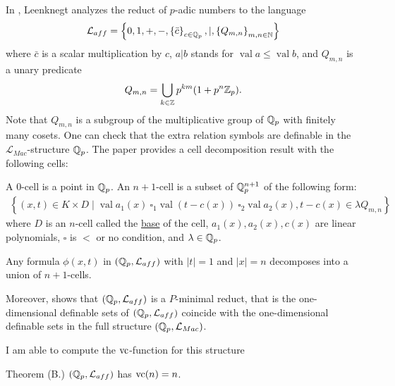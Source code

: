 \documentclass{amsart}
\renewcommand{\LL}{\mathcal L}
\newcommand{\LLM}{\mathcal L_{Mac}}
\newcommand{\curly}[1]{\left\{#1\right\}}
\DeclareMathOperator{\vval}{val}
\newcommand{\defn}{\underline}
\begin{document}
In \cite{reduct}, Leenknegt analyzes the reduct of $p$-adic numbers to the language
\begin{align*}
  \LL_{aff}  = \curly{0, 1, +, -, \curly{\bar c}_{c \in \Q_p}, |, \curly{Q_{m,n}}_{m,n\in \N}}
\end{align*}
where $\bar c$ is a scalar multiplication by $c$,
$a | b$ stands for $\vval a \leq \vval b$,
and $Q_{m,n}$ is a unary predicate
\begin{align*}
  Q_{m,n} = \bigcup_{k \in \mathbb{Z}} p^{km} (1 + p^n\mathbb{Z}_p).
\end{align*}
Note that $Q_{m,n}$ is a subgroup of the multiplicative group of $\mathbb{Q}_p$ with finitely many cosets.
One can check that the extra relation symbols are definable in the $\LLM$-structure $\mathbb{Q}_p$.
The paper \cite{reduct} provides a cell decomposition result with the following cells:

\begin{Definition}
  A $0$-cell is a point in $\mathbb{Q}_p$.
  An $n+1$-cell is a subset of $\mathbb{Q}_p^{n+1}$ of the following form:
  \begin{align*}
    \curly{(x, t) \in K \times D \mid \vval a_1(x) \ \square_1 \vval (t - c(x)) \ \square_2 \vval a_2(x), t - c(x) \in \lambda Q_{m,n} }
  \end{align*}
  where $D$ is an $n$-cell called the \defn{base} of the cell,
  $a_1(x), a_2(x), c(x)$ are linear polynomials,
  $\square$ is $<$ or no condition, and
  $\lambda  \in\mathbb{Q}_p$.
\end{Definition}

\begin{Theorem}[Leenknegt '12] 
  Any formula $\phi(x, t)$ in $(\Q_p, \LL_{aff})$ with $|t| = 1$ and $|x| = n$ decomposes into a union of $n+1$-cells.
\end{Theorem}  

Moreover, \cite{reduct} shows that $(\Q_p, \LL_{aff})$ is a $P$-minimal reduct,
that is the one-dimensional definable sets of $(\Q_p, \LL_{aff})$ coincide with the one-dimensional definable sets in the full structure $(\Q_p, \LLM)$.

I am able to compute the $\operatorname{vc}$-function for this structure
\begin{Theorem} {Theorem (B.)}
  $(\Q_p, \LL_{aff})$ has $\operatorname{vc}(n) = n$.
\end{Theorem}




\end{document}
